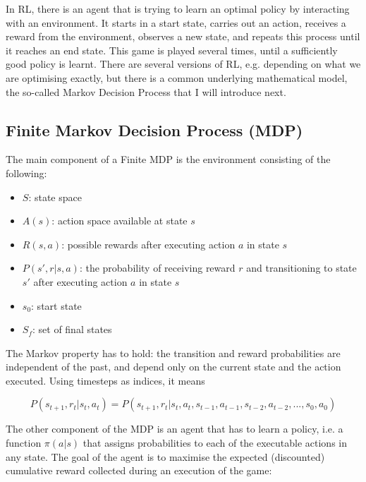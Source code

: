 In RL, there is an agent that is trying to learn an optimal policy by interacting with an environment. It starts in a start state, carries out an action, receives a reward from the environment, observes a new state, and repeats this process until it reaches an end state. This game is played several times, until a sufficiently good policy is learnt. There are several versions of RL, e.g. depending on what we are optimising exactly, but there is a common underlying mathematical model, the so-called Markov Decision Process that I will introduce next.

\subsection{Finite Markov Decision Process (MDP)}


The main component of a Finite MDP is the environment consisting of the following:

\begin{itemize}
    \item 
    $S$: state space
    \item
    $A(s)$: action space available at state $s$
    \item
    $R(s, a)$: possible rewards after executing action $a$ in state $s$
    \item
    $P(s', r | s, a)$: the probability of receiving reward $r$ and transitioning to state $s'$ after executing action $a$ in state $s$
    \item
    $s_0$: start state
    \item
    $S_f$: set of final states
\end{itemize} 


The Markov property has to hold: the transition and reward probabilities are independent of the past, and depend only on the current state and the action executed. Using timesteps as indices, it means

\begin{equation} \label{eq:MarkovProperty}
    P(s_{t+1},r_{t} | s_{t}, a_{t}) = P(s_{t+1},r_{t} | s_{t}, a_{t}, s_{t-1}, a_{t-1}, s_{t-2}, a_{t-2}, ..., s_{0}, a_{0})
\end{equation}


The other component of the MDP is an agent that has to learn a policy, i.e. a function $\pi(a|s)$ that assigns probabilities to each of the executable actions in any state. The goal of the agent is to maximise the expected (discounted) cumulative reward collected during an execution of the game:

